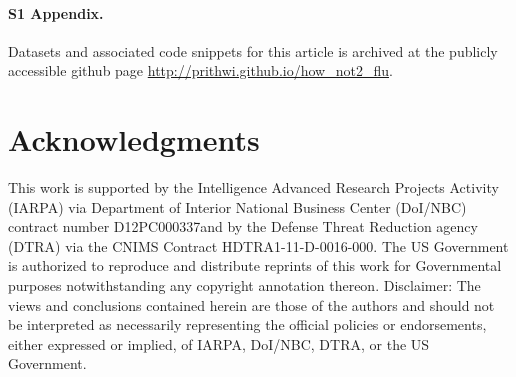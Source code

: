 \documentclass[10pt,letterpaper]{article}
\begin{document}
\paragraph*{S1 Appendix.}
\label{S1_Appendix}
Datasets and associated code snippets for this article is archived at the
publicly accessible github page \url{http://prithwi.github.io/how_not2_flu}.


\section*{Acknowledgments}
This work is supported by the Intelligence Advanced Research Projects Activity
(IARPA) via Department of Interior National Business Center (DoI/NBC) contract
number D12PC000337and by the Defense Threat Reduction agency (DTRA) via the
CNIMS Contract HDTRA1-11-D-0016-000. The US Government is authorized to
reproduce and distribute reprints of this work for Governmental purposes
notwithstanding any copyright annotation thereon. Disclaimer: The views and
conclusions contained herein are those of the authors and should not be
interpreted as necessarily representing the official policies or endorsements,
either expressed or implied, of IARPA, DoI/NBC, DTRA, or the US Government.

\nolinenumbers

% 

\end{document}
